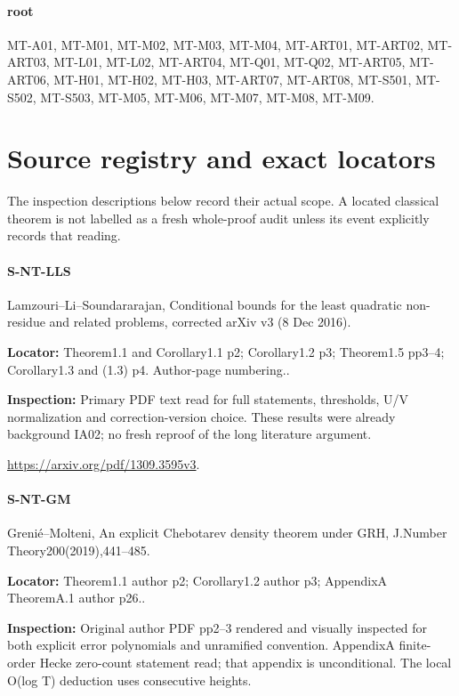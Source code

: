 \documentclass[11pt,a4paper]{article}
\begin{document}
\paragraph{root} MT-A01, MT-M01, MT-M02, MT-M03, MT-M04, MT-ART01, MT-ART02, MT-ART03, MT-L01, MT-L02, MT-ART04, MT-Q01, MT-Q02, MT-ART05, MT-ART06, MT-H01, MT-H02, MT-H03, MT-ART07, MT-ART08, MT-S501, MT-S502, MT-S503, MT-M05, MT-M06, MT-M07, MT-M08, MT-M09.
\section*{Source registry and exact locators}
The inspection descriptions below record their actual scope. A located
classical theorem is not labelled as a fresh whole-proof audit unless
its event explicitly records that reading.

\paragraph{S-NT-LLS} Lamzouri–\allowbreak{}Li–\allowbreak{}Soundararajan, Conditional bounds for the least quadratic non-residue and related problems, corrected arXiv v3 (8 Dec 2016).

\textbf{Locator:} Theorem1.\allowbreak{}1 and Corollary1.\allowbreak{}1 p2; Corollary1.\allowbreak{}2 p3; Theorem1.\allowbreak{}5 pp3–\allowbreak{}4; Corollary1.\allowbreak{}3 and (1.\allowbreak{}3) p4.\allowbreak{} Author-page numbering.\allowbreak{}.

\textbf{Inspection:} Primary PDF text read for full statements, thresholds, U/\allowbreak{}V normalization and correction-version choice.\allowbreak{} These results were already background IA02; no fresh reproof of the long literature argument.\allowbreak{}

\url{https://arxiv.org/pdf/1309.3595v3}.

\paragraph{S-NT-GM} Grenié–\allowbreak{}Molteni, An explicit Chebotarev density theorem under GRH, J.\allowbreak{}Number Theory200(2019),441–\allowbreak{}485.

\textbf{Locator:} Theorem1.\allowbreak{}1 author p2; Corollary1.\allowbreak{}2 author p3; AppendixA TheoremA.\allowbreak{}1 author p26.\allowbreak{}.

\textbf{Inspection:} Original author PDF pp2–\allowbreak{}3 rendered and visually inspected for both explicit error polynomials and unramified convention.\allowbreak{} AppendixA finite-order Hecke zero-count statement read; that appendix is unconditional.\allowbreak{} The local O(log T) deduction uses consecutive heights.\allowbreak{}
\end{document}
